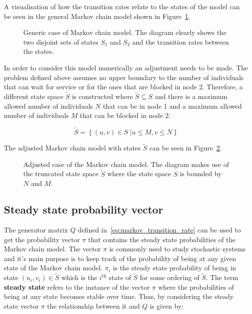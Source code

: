 A visualisation of how the transition rates relate to the states of the model
can be seen in the general Markov chain model shown in
Figure~\ref{fig:general_markov_model}.

\begin{figure}[H]
    \centering
    \scalebox{.8}
    {}
    \caption{Generic case of Markov chain model. The diagram clearly shows the
    two disjoint sets of states \(S_1\) and \(S_2\) and the transition rates
    between the states.} 
    \label{fig:general_markov_model}
\end{figure}


In order to consider this model numerically an adjustment needs to be made.
The problem defined above assumes no upper boundary to the number of individuals
that can wait for service or for the ones that are blocked in node 2.
Therefore, a different state space \( \tilde S \) is constructed where
\( \tilde S \subseteq S \) and there is a maximum allowed number of individuals
\(N\) that can be in node 1 and a maximum allowed number of individuals
\(M\) that can be blocked in node 2:

\begin{equation}\label{eq:truncated_state_space}
    \tilde S = \left\{ (u, v) \in S\;| u \leq M, v\leq N \right\}
\end{equation}

The adjusted Markov chain model with states \(\tilde S\) can be seen in
Figure~\ref{fig:adjusted_markov_model}.

\begin{figure}[H]
    \centering
    \scalebox{.8}
    {}
    \caption{Adjusted case of the Markov chain model. The diagram makes use of
    the truncated state space \( \tilde S \) where the state space \(S\) is
    bounded by \(N\) and \(M\).}
    \label{fig:adjusted_markov_model}
\end{figure}


\subsection{Steady state probability vector}
\label{sec:steady_state_probabilities}

The generator matrix \( Q \) defined in~\eqref{eq:markov_transition_rate} can
be used to get the probability vector \( \pi \) that contains the steady state
probabilities of the Markov chain model.
The vector \( \pi \) is commonly used to study stochastic systems and it's main
purpose is to keep track of the probability of being at any given state of
the Markov chain model.
\(\pi_i\) is the steady state probability of being in state \((u_i, v_i) \in
\tilde S\) which is the \(i^{\text{th}}\) state of \(\tilde S\) for some
ordering of \(\tilde S\).
The term \textbf{steady state} refers to the instance of the vector \( \pi \)
where the probabilities of being at any state becomes stable over time.
Thus, by considering the steady state vector \( \pi \) the relationship between
it and \( Q \) is given by:

